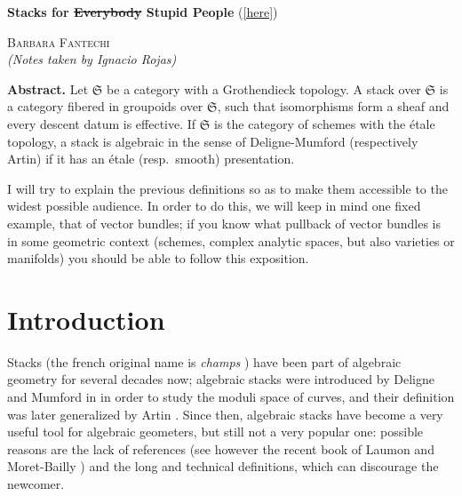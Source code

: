 \documentclass[12pt]{memoir}
\def\nauthor{Ignacio Rojas}
\begin{document}

\begin{center}
{\LARGE\bfseries Stacks for \sout{Everybody} Stupid People} (\ref{here})
\end{center}

\vspace{1em}

\begin{flushleft}
{\large\textsc{Barbara Fantechi}}\\[0.5em]
{\small\itshape (Notes taken by \nauthor)}
\end{flushleft}

\vspace{1em}

\noindent\textbf{Abstract.} Let $\mathfrak{S}$ be a category with a Grothendieck topology. A stack over $\mathfrak{S}$ is a category fibered in groupoids over $\mathfrak{S}$, such that isomorphisms form a sheaf and every descent datum is effective. If $\mathfrak{S}$ is the category of schemes with the \'etale topology, a stack is algebraic in the sense of Deligne-Mumford (respectively Artin) if it has an \'etale (resp.\ smooth) presentation.

I will try to explain the previous definitions so as to make them accessible to the widest possible audience. In order to do this, we will keep in mind one fixed example, that of vector bundles; if you know what pullback of vector bundles is in some geometric context (schemes, complex analytic spaces, but also varieties or manifolds) you should be able to follow this exposition.

\let\thefootnote\relax{}

\section{Introduction}

Stacks (the french original name is \emph{champs} \cite{4}) have been part of algebraic geometry for several decades now; algebraic stacks were introduced by Deligne and Mumford in \cite{3} in order to study the moduli space of curves, and their definition was later generalized by Artin \cite{1}. Since then, algebraic stacks have become a very useful tool for algebraic geometers, but still not a very popular one: possible reasons are the lack of references (see however the recent book of Laumon and Moret-Bailly \cite{5}) and the long and technical definitions, which can discourage the newcomer.
\end{document}
